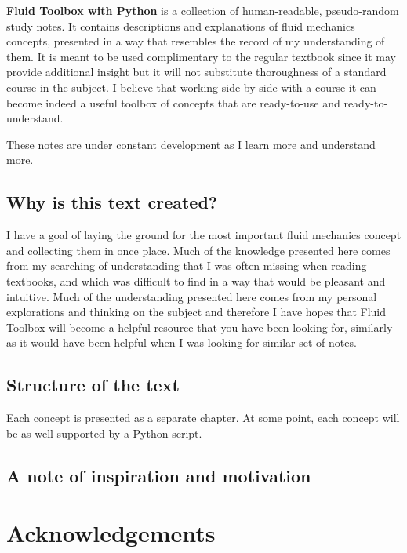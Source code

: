 \documentclass[10pt]{report}
\begin{document}


\textbf{Fluid Toolbox \selectfont {}\selectfont with Python} is a collection of human-readable, pseudo-random study notes. It contains descriptions and explanations of fluid mechanics concepts, presented in a way that resembles the record of my understanding of them. It is meant to be used complimentary to the regular textbook since it may provide additional insight but it will not substitute thoroughness of a standard course in the subject. I believe that working side by side with a course it can become indeed a useful toolbox of concepts that are ready-to-use and ready-to-understand.

These notes are under constant development as I learn more and understand more.

\section*{Why is this text created?}

I have a goal of laying the ground for the most important fluid mechanics concept and collecting them in once place. Much of the knowledge presented here comes from my searching of understanding that I was often missing when reading textbooks, and which was difficult to find in a way that would be pleasant and intuitive. Much of the understanding presented here comes from my personal explorations and thinking on the subject and therefore I have hopes that Fluid Toolbox will become a helpful resource that you have been looking for, similarly as it would have been helpful when I was looking for similar set of notes.

\section*{Structure of the text}

Each concept is presented as a separate chapter. At some point, each concept will be as well supported by a Python script.

\section*{A note of inspiration and motivation}

\newpage
\chapter*{Acknowledgements}
\thispagestyle{empty}
\end{document}
